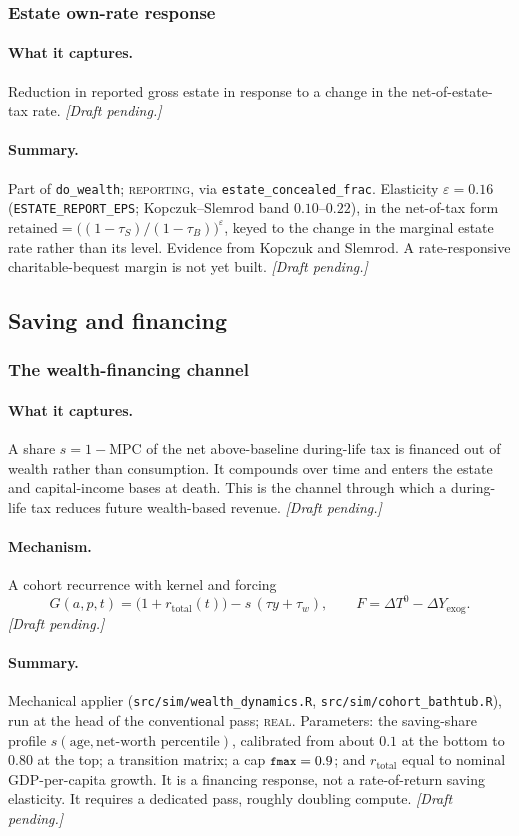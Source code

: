 \documentclass[11pt]{article}
\newcommand{\code}[1]{\texttt{\small #1}}
\newcommand{\pending}{\textit{[Draft pending.]}}
\newcommand{\field}[1]{\paragraph{#1.}}
\begin{document}
\subsubsection{Estate own-rate response}
\label{sec:estate-ownrate}

\field{What it captures}
Reduction in reported gross estate in response to a change in the
net-of-estate-tax rate. \pending

\field{Summary}
Part of \code{do_wealth}; \textsc{reporting}, via \code{estate_concealed_frac}.
Elasticity $\varepsilon=0.16$ (\code{ESTATE_REPORT_EPS}; Kopczuk--Slemrod band
$0.10$--$0.22$), in the net-of-tax form
$\text{retained}=\big((1-\tau_S)/(1-\tau_B)\big)^{\varepsilon}$, keyed to the
change in the marginal estate rate rather than its level. Evidence from Kopczuk
and Slemrod. A rate-responsive charitable-bequest margin is not yet built.
\pending

\subsection{Saving and financing}

\subsubsection{The wealth-financing channel}
\label{sec:bathtub}

\field{What it captures}
A share $s=1-\text{MPC}$ of the net above-baseline during-life tax is financed
out of wealth rather than consumption. It compounds over time and enters the
estate and capital-income bases at death. This is the channel through which a
during-life tax reduces future wealth-based revenue. \pending

\field{Mechanism}
A cohort recurrence with kernel and forcing
\[
G(a,p,t) = \big(1+r_{\text{total}}(t)\big) - s\,(\tau y + \tau_w),
\qquad
F = \Delta T^{0} - \Delta Y_{\text{exog}}.
\]
\pending

\field{Summary}
Mechanical applier (\code{src/sim/wealth_dynamics.R},
\code{src/sim/cohort_bathtub.R}), run at the head of the conventional pass;
\textsc{real}. Parameters: the saving-share profile $s(\text{age},\text{net-worth
percentile})$, calibrated from about $0.1$ at the bottom to $0.80$ at the top; a
transition matrix; a cap $\code{fmax}=0.9$; and $r_{\text{total}}$ equal to
nominal GDP-per-capita growth. It is a financing response, not a rate-of-return
saving elasticity. It requires a dedicated pass, roughly doubling compute.
\pending
\end{document}
